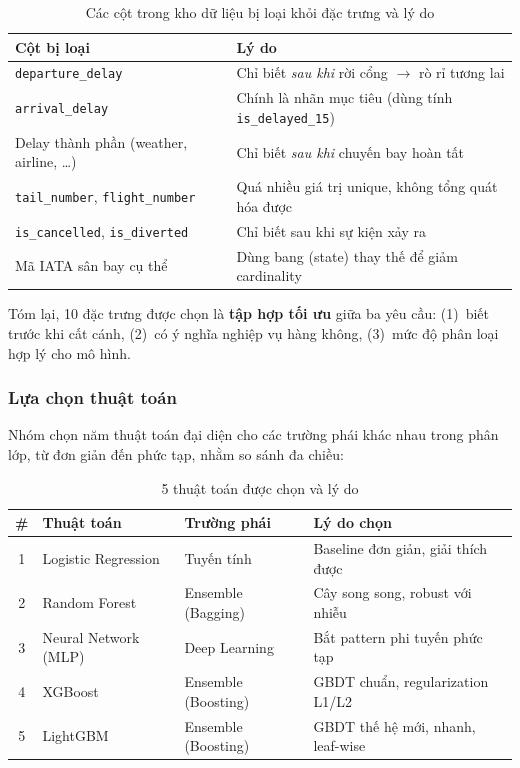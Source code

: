 \begin{table}[H]
\centering
\caption{Các cột trong kho dữ liệu bị loại khỏi đặc trưng và lý do}
\vspace{5pt}
\small
\begin{tabular}{|l|l|}
\hline
\textbf{Cột bị loại} & \textbf{Lý do} \\ \hline
\texttt{departure\_delay} & Chỉ biết \textit{sau khi} rời cổng $\rightarrow$ rò rỉ tương lai \\ \hline
\texttt{arrival\_delay} & Chính là nhãn mục tiêu (dùng tính \texttt{is\_delayed\_15}) \\ \hline
Delay thành phần (weather, airline, \ldots) & Chỉ biết \textit{sau khi} chuyến bay hoàn tất \\ \hline
\texttt{tail\_number}, \texttt{flight\_number} & Quá nhiều giá trị unique, không tổng quát hóa được \\ \hline
\texttt{is\_cancelled}, \texttt{is\_diverted} & Chỉ biết sau khi sự kiện xảy ra \\ \hline
Mã IATA sân bay cụ thể & Dùng bang (state) thay thế để giảm cardinality \\ \hline
\end{tabular}
\label{tab:excluded_features}
\end{table}

\noindent
Tóm lại, 10 đặc trưng được chọn là \textbf{tập hợp tối ưu} giữa ba yêu cầu:
(1)~biết trước khi cất cánh, (2)~có ý nghĩa nghiệp vụ hàng không,
(3)~mức độ phân loại hợp lý cho mô hình.

\subsubsection{Lựa chọn thuật toán}

Nhóm chọn năm thuật toán đại diện cho các trường phái khác nhau
trong phân lớp, từ đơn giản đến phức tạp, nhằm so sánh đa chiều:

\begin{table}[H]
\centering
\caption{5 thuật toán được chọn và lý do}
\vspace{5pt}
\small
\begin{tabular}{|c|l|l|l|}
\hline
\textbf{\#} & \textbf{Thuật toán} & \textbf{Trường phái} & \textbf{Lý do chọn} \\ \hline
1 & Logistic Regression & Tuyến tính & Baseline đơn giản, giải thích được \\ \hline
2 & Random Forest       & Ensemble (Bagging) & Cây song song, robust với nhiễu \\ \hline
3 & Neural Network (MLP) & Deep Learning & Bắt pattern phi tuyến phức tạp \\ \hline
4 & XGBoost             & Ensemble (Boosting) & GBDT chuẩn, regularization L1/L2 \\ \hline
5 & LightGBM            & Ensemble (Boosting) & GBDT thế hệ mới, nhanh, leaf-wise \\ \hline
\end{tabular}
\label{tab:model_selection}
\end{table}


